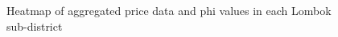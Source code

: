 \documentclass[
  default,
]{sn-jnl}
\begin{document}
\begin{figure}

\begin{minipage}{0.50\linewidth}



\end{minipage}%
%
\begin{minipage}{0.50\linewidth}



\end{minipage}%

\caption{\label{fig-pricenphi}Heatmap of aggregated price data and phi
values in each Lombok sub-district}

\end{figure}%
\end{document}
